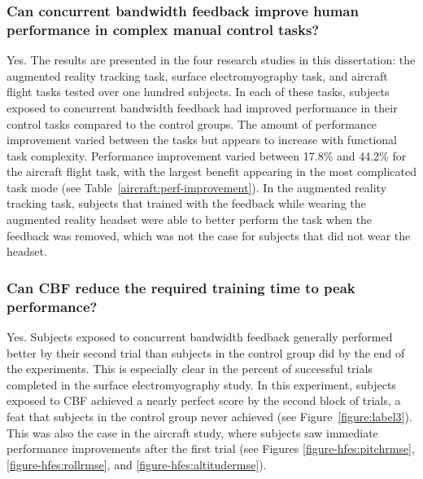 \subsubsection{Can concurrent bandwidth feedback improve human performance in complex manual control tasks?}
Yes.
The results are presented in the four research studies in this dissertation: the augmented reality tracking task, surface electromyography task, and aircraft flight tasks tested over one hundred subjects.
In each of these tasks, subjects exposed to concurrent bandwidth feedback had improved performance in their control tasks compared to the control groups.
The amount of performance improvement varied between the tasks but appears to increase with functional task complexity.
Performance improvement varied between 17.8\% and 44.2\% for the aircraft flight task, with the largest benefit appearing in the most complicated task mode (see Table~\ref{aircraft:perf-improvement}).
In the augmented reality tracking task, subjects that trained with the feedback while wearing the augmented reality headset were able to better perform the task when the feedback was removed, which was not the case for subjects that did not wear the headset.

\subsubsection{Can CBF reduce the required training time to peak performance?}
Yes.
Subjects exposed to concurrent bandwidth feedback generally performed better by their second trial than subjects in the control group did by the end of the experiments.
This is especially clear in the percent of successful trials completed in the surface electromyography study.
In this experiment, subjects exposed to CBF achieved a nearly perfect score by the second block of trials, a feat that subjects in the control group never achieved (see Figure~\ref{figure:label3}).
This was also the case in the aircraft study, where subjects saw immediate performance improvements after the first trial (see Figures \ref{figure-hfes:pitchrmse}, \ref{figure-hfes:rollrmse}, and \ref{figure-hfes:altitudermse}).

